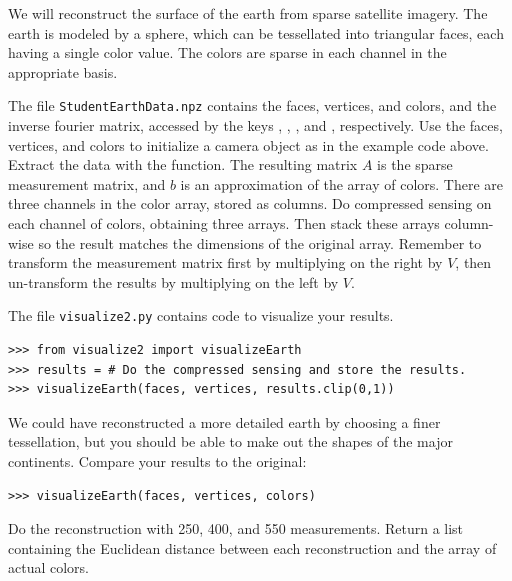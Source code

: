 \begin{problem} %
We will reconstruct the surface of the earth from sparse satellite imagery. The earth is modeled by a sphere, which can be tessellated into triangular faces, each having a single color value.
The colors are sparse in each channel in the appropriate basis. 

The file \texttt{StudentEarthData.npz} contains the faces, vertices, and colors, and the inverse fourier matrix, accessed by the keys , , , and , respectively.
Use the faces, vertices, and colors to initialize a camera object as in the example code above.
Extract the data with the  function.
The resulting matrix $A$ is the sparse measurement matrix, and $b$ is an approximation of the array of colors.
There are three channels in the color array, stored as columns.
Do compressed sensing on each channel of colors, obtaining three arrays.
Then stack these arrays column-wise so the result matches the dimensions of the original array.
Remember to transform the measurement matrix first by multiplying on the right by $V$, then un-transform the results by multiplying on the left by $V$.

The file \texttt{visualize2.py} contains code to visualize your results.
\begin{lstlisting}
>>> from visualize2 import visualizeEarth
>>> results = # Do the compressed sensing and store the results.
>>> visualizeEarth(faces, vertices, results.clip(0,1))
\end{lstlisting}

We could have reconstructed a more detailed earth by choosing a finer tessellation, but you should be able to make out the shapes of the major continents.
Compare your results to the original:
\begin{lstlisting}
>>> visualizeEarth(faces, vertices, colors)
\end{lstlisting}

Do the reconstruction with 250, 400, and 550 measurements.
Return a list containing the Euclidean distance between each reconstruction and the array of actual colors.
\end{problem}